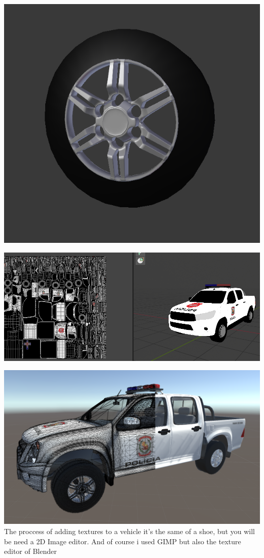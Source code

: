 \documentclass{article}
\begin{document}
  \includegraphics[width=\textwidth]{14.png}

  \includegraphics[width=\textwidth]{33.png}

  \includegraphics[width=\textwidth]{23.png}
  The proccess of adding textures to a vehicle it's the same of a shoe, but you will be need a 2D Image editor. And of course i used GIMP but also the texture editor of Blender
\end{document}
